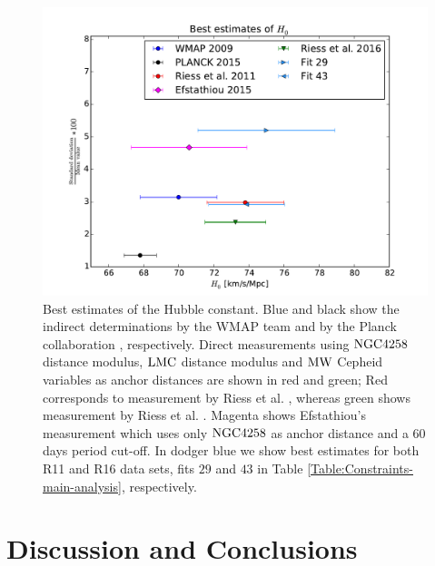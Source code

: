\begin{figure}[hbtp]
\centering
\includegraphics[scale=0.75]{figures/chapter-h0/H0_best_values_R16.pdf}
\caption{Best estimates of the Hubble constant. Blue and black show the indirect determinations by the WMAP team \cite{Hinshaw:2012aka} and by the Planck collaboration \cite{Ade:2015xua}, respectively. Direct measurements using $\mathrm{NGC4258}$ distance modulus, $\mathrm{LMC}$ distance modulus and $\mathrm{MW}$ Cepheid variables as anchor distances are shown in red and green; Red corresponds to measurement by Riess et al. \cite{Riess:2011yx}, whereas green shows measurement by Riess et al. \cite{Riess:2016jrr}. Magenta shows Efstathiou's measurement \cite{Efstathiou:2013via} which uses only $\mathrm{NGC4258}$ as anchor distance and a $60$ days period cut-off. In dodger blue we show best estimates for both R11 and R16 data sets, fits $29$ and $43$ in Table \ref{Table:Constraints-main-analysis}, respectively.}
\label{Fig:Best-estimates-H0-R16}
\end{figure}


\section{Discussion and Conclusions}
\label{chapter-h0:Summary}


